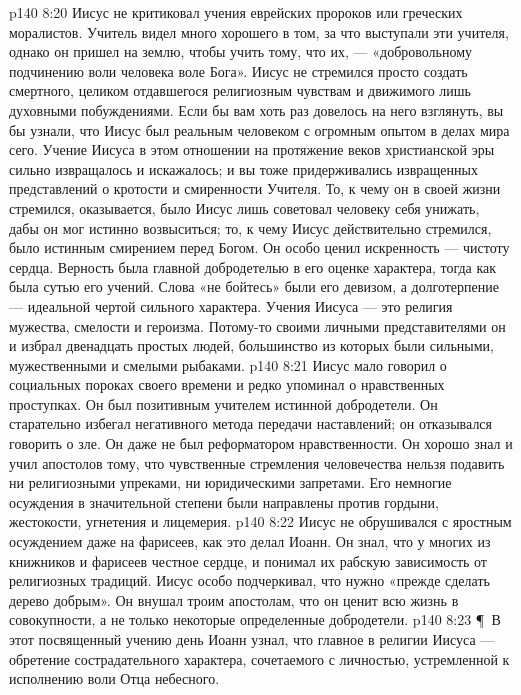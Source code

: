 \vs p140 8:20 Иисус не критиковал учения еврейских пророков или греческих моралистов. Учитель видел много хорошего в том, за что выступали эти учителя, однако он пришел на землю, чтобы учить тому, что  их, --- «добровольному подчинению воли человека воле Бога». Иисус не стремился просто создать  смертного, целиком отдавшегося религиозным чувствам и движимого лишь духовными побуждениями. Если бы вам хоть раз довелось на него взглянуть, вы бы узнали, что Иисус был реальным человеком с огромным опытом в делах мира сего. Учение Иисуса в этом отношении на протяжение веков христианской эры сильно извращалось и искажалось; и вы тоже придерживались извращенных представлений о кротости и смиренности Учителя. То, к чему он в своей жизни стремился, оказывается, было  Иисус лишь советовал человеку себя унижать, дабы он мог истинно возвыситься; то, к чему Иисус действительно стремился, было истинным смирением перед Богом. Он особо ценил искренность --- чистоту сердца. Верность была главной добродетелью в его оценке характера, тогда как  была сутью его учений. Слова «не бойтесь» были его девизом, а долготерпение --- идеальной чертой сильного характера. Учения Иисуса --- это религия мужества, смелости и героизма. Потому\hyp{}то своими личными представителями он и избрал двенадцать простых людей, большинство из которых были сильными, мужественными и смелыми рыбаками.
\vs p140 8:21 Иисус мало говорил о социальных пороках своего времени и редко упоминал о нравственных проступках. Он был позитивным учителем истинной добродетели. Он старательно избегал негативного метода передачи наставлений; он отказывался говорить о зле. Он даже не был реформатором нравственности. Он хорошо знал и учил апостолов тому, что чувственные стремления человечества нельзя подавить ни религиозными упреками, ни юридическими запретами. Его немногие осуждения в значительной степени были направлены против гордыни, жестокости, угнетения и лицемерия.
\vs p140 8:22 Иисус не обрушивался с яростным осуждением даже на фарисеев, как это делал Иоанн. Он знал, что у многих из книжников и фарисеев честное сердце, и понимал их рабскую зависимость от религиозных традиций. Иисус особо подчеркивал, что нужно «прежде сделать дерево добрым». Он внушал троим апостолам, что он ценит всю жизнь в совокупности, а не только некоторые определенные добродетели.
\vs p140 8:23 \P\ В этот посвященный учению день Иоанн узнал, что главное в религии Иисуса --- обретение сострадательного характера, сочетаемого с личностью, устремленной к исполнению воли Отца небесного.
